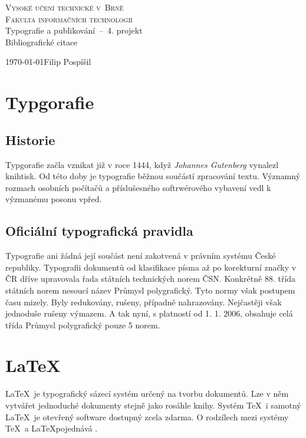 \documentclass[a4paper, 11pt]{article}
\begin{document}
    \begin{titlepage}
        \begin{center}
        	{\Huge\textsc{
				Vysoké učení technické v~Brně  \\
			}}
			{\huge\textsc{
				Fakulta informačních technologií \\
			}}
			{\LARGE{Typografie a publikování \,--\, 4. projekt \\
			}}
			{\Huge
			{Bibliograf{}ické citace
			}}
        \end{center}

        {\Large{\today \hfill Filip Pospíšil
        }}
    \end{titlepage}

    \section{Typgorafie}
    \subsection{Historie}
    Typgorafie začla vznikat již v roce 1444, když \textit{Johannes Gutenberg} vynalezl knihtisk. Od této doby je typografie běžnou součástí zpracování textu. Významný rozmach osobních počítačů a příslušesného softrwérového vybavení vedl k výzmanému posonu vpřed. \cite{Rybicka}

    \subsection{Oficiální typografická pravidla}
    Typografie ani žádná její součást není zakotvená v právním systému České republiky. Typografii  dokumentů od klasifikace písma až po korekturní značky v ČR dříve upravovala řada státních  technických norem ČSN. Konkrétně 88. třída státních norem nesoucí název Průmysl polygrafický.  Tyto normy však postupem času mizely. Byly redukovány, rušeny, případně nahrazovány. Nejčastěji  však jednoduše rušeny výmazem. A tak nyní, s platností od 1. 1. 2006, obsahuje celá třída Průmysl  polygrafický pouze 5 norem. \cite{Sirucek}

    \section{\LaTeX}
    \LaTeX\ je typografický sázecí systém určený na tvorbu dokumentů. Lze v něm vytvářet jednoduché dokumenty stejně jako rosáhle knihy. Systém \TeX\ i samotný \LaTeX\ je otevřený software dostupný zcela zdarma. O rodzílech mezi systémy \TeX\ a \LaTeX pojednává \cite{Helmut}.
\end{document}

